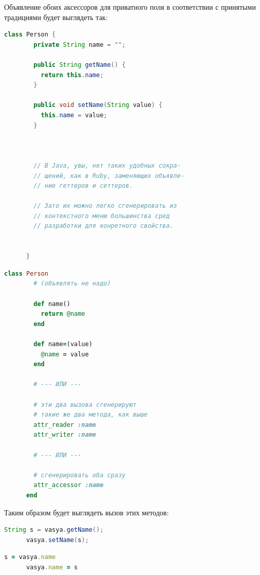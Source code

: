 \documentclass[a4paper, 14pt, titlepage]{extarticle}
\newenvironment{halfpage}%
    {\noindent\begin{minipage}[h]{0.49\linewidth}} %
    {\end{minipage}\hfill}
\begin{document}
  Объявление обоих аксессоров для приватного поля в соответствии с принятыми традициями будет
  выглядеть так:

  \begin{halfpage}
    \begin{lstlisting}[language=Java, title={Геттеры/сеттеры в Java}, gobble=6, texcl]
      class Person {
        private String name = "";

        public String getName() {
          return this.name;
        }

        public void setName(String value) {
          this.name = value;
        }



        // В Java, увы, нет таких удобных сокра-
        // щений, как в Ruby, заменяющих объявле-
        // ние геттеров и сеттеров.

        // Зато их можно легко сгенерировать из
        // контекстного меню большинства сред
        // разработки для конретного свойства.


      }
    \end{lstlisting}
  \end{halfpage}
  \begin{halfpage}
    \begin{lstlisting}[language=Ruby, title={Аксессоры в Ruby}, gobble=6, texcl]
      class Person
        # (объявлять не надо)

        def name()
          return @name
        end

        def name=(value)
          @name = value
        end

        # --- ИЛИ ---

        # эти два вызова сгенерируют
        # такие же два метода, как выше
        attr_reader :name
        attr_writer :name

        # --- ИЛИ ---

        # сгенерировать оба сразу
        attr_accessor :name
      end
    \end{lstlisting}
  \end{halfpage}

  Таким образом будет выглядеть вызов этих методов:

  \begin{halfpage}
    \begin{lstlisting}[language=Java, title={Вызов геттера/сеттера в Java}, gobble=6, texcl]
      String s = vasya.getName();
      vasya.setName(s);
    \end{lstlisting}
  \end{halfpage}
  \begin{halfpage}
    \begin{lstlisting}[language=Ruby, title={Вызов аксессоров в Ruby}, gobble=6, texcl]
      s = vasya.name
      vasya.name = s
    \end{lstlisting}
  \end{halfpage}
\end{document}
